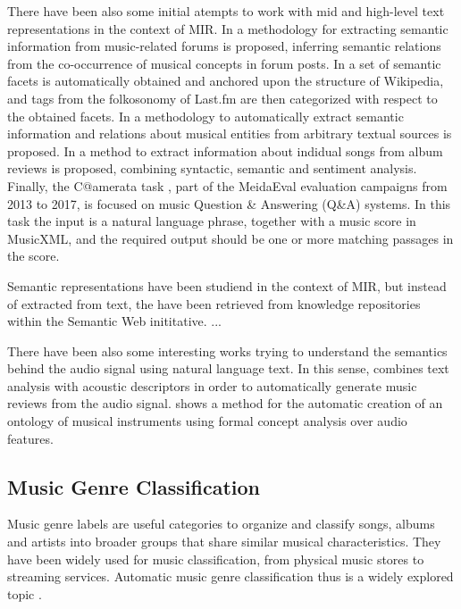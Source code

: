 There have been also some initial atempts to work with mid and high-level text representations in the context of MIR. In \cite{Sordo2012} a methodology for extracting semantic information from music-related forums is proposed, inferring semantic relations from the co-occurrence of musical concepts in forum posts. 
In \cite{Sordo2013} a set of semantic facets is automatically obtained and anchored upon the structure of Wikipedia, and tags from the folkosonomy of Last.fm are then categorized with respect to the obtained facets. 
In \cite{Knees2011} a methodology to automatically extract semantic information and relations about musical entities from arbitrary textual sources is proposed. In \cite{TataandDiEugenio2010} a method to extract information about indidual songs from album reviews is proposed, combining syntactic, semantic and sentiment analysis. Finally, the C@amerata task \cite{sutcliffe2016c, sutcliffe2015}, part of the MeidaEval evaluation campaigns from 2013 to 2017, is focused on music Question & Answering (Q&A) systems. In this task the input is a natural language phrase, together with a music score in MusicXML, and the required output should be one or more matching passages in the score.

Semantic representations have been studiend in the context of MIR, but instead of extracted from text, the have been retrieved from knowledge repositories within the Semantic Web inititative. ...

There have been also some interesting works trying to understand the semantics behind the audio signal using natural language text. In this sense, \cite{Whitman2004} combines text analysis with acoustic descriptors in order to automatically generate music reviews from the audio signal. \cite{Kolozali2013} shows a method for the automatic creation of an ontology of musical instruments using formal concept analysis over audio features. 

\subsection{Music Genre Classification}
\label{sec:SOA:mir:classfication}

Music genre labels are useful categories to organize and classify songs, albums and artists into broader groups that share similar musical characteristics. They have been widely used for music classification, from physical music stores to streaming services. Automatic music genre classification thus is a widely explored topic \citep{sturm2012survey}.

